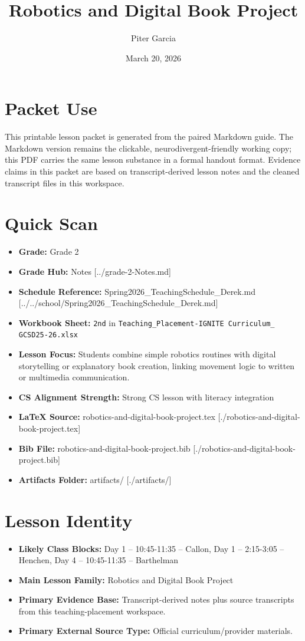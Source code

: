 \documentclass[11pt]{article}
\title{Robotics and Digital Book Project}
\author{Piter Garcia}
\date{March 20, 2026}
\begin{document}
\maketitle
\section*{Packet Use}
This printable lesson packet is generated from the paired Markdown guide. The Markdown version remains the clickable, neurodivergent-friendly working copy; this PDF carries the same lesson substance in a formal handout format. Evidence claims in this packet are based on transcript-derived lesson notes and the cleaned transcript files in this workspace.

\section*{Quick Scan}
\begin{itemize}[leftmargin=*]
\item \textbf{Grade:} Grade 2
\item \textbf{Grade Hub:} Notes [../grade-2-Notes.md]
\item \textbf{Schedule Reference:} Spring2026\_TeachingSchedule\_Derek.md [../../school/Spring2026\_TeachingSchedule\_Derek.md]
\item \textbf{Workbook Sheet:} \texttt{2nd} in \texttt{Teaching\_Placement-IGNITE Curriculum\_ GCSD25-26.xlsx}
\item \textbf{Lesson Focus:} Students combine simple robotics routines with digital storytelling or explanatory book creation, linking movement logic to written or multimedia communication.
\item \textbf{CS Alignment Strength:} Strong CS lesson with literacy integration
\item \textbf{LaTeX Source:} robotics-and-digital-book-project.tex [./robotics-and-digital-book-project.tex]
\item \textbf{Bib File:} robotics-and-digital-book-project.bib [./robotics-and-digital-book-project.bib]
\item \textbf{Artifacts Folder:} artifacts/ [./artifacts/]
\end{itemize}

\section*{Lesson Identity}
\begin{itemize}[leftmargin=*]
\item \textbf{Likely Class Blocks:} Day 1 -- 10:45-11:35 -- Callon, Day 1 -- 2:15-3:05 -- Henchen, Day 4 -- 10:45-11:35 -- Barthelman
\item \textbf{Main Lesson Family:} Robotics and Digital Book Project
\item \textbf{Primary Evidence Base:} Transcript-derived notes plus source transcripts from this teaching-placement workspace.
\item \textbf{Primary External Source Type:} Official curriculum/provider materials.
\end{itemize}
\end{document}
